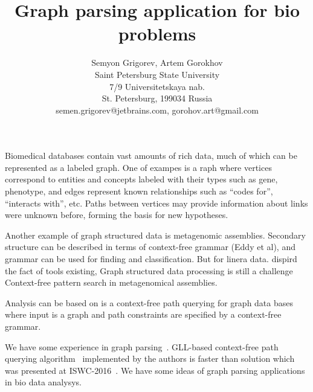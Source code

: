 \documentclass[12pt]{article}  %
\title{Graph parsing application for bio problems}
\author{Semyon Grigorev, Artem Gorokhov
\\
       {Saint Petersburg State University}\\
       {7/9 Universitetskaya nab.}\\
       {St. Petersburg, 199034 Russia}\\
       semen.grigorev@jetbrains.com, gorohov.art@gmail.com
       }
\date{}
\theoremstyle{definition}
\theoremstyle{remark}
\begin{document}
\maketitle

Biomedical databases contain vast amounts of rich data, much of which can be represented as a labeled graph.
One of exampes is a raph where vertices correspond to entities and concepts labeled with their types such as gene, phenotype, and edges represent known relationships such as ``codes for'', ``interacts with'', etc.
Paths between vertices may provide information about links were unknown before, forming the basis for new hypotheses.

Another example of graph structured data is metagenomic assemblies.
Secondary structure can be described in terms of context-free grammar (Eddy et al), and grammar can be used for finding and classification.
But for linera data. 
dispird the fact of tools existing, Graph structured data processing is still a challenge
Context-free pattern search in metagenomical assemblies. 

Analysis can be based on is a context-free path querying for graph data bases where input is a graph and path constraints are specified by a context-free grammar.


We have some experience in graph parsing~\cite{GraphGLL, RelaxedRNGLR}.
GLL-based context-free path querying algorithm~\cite{GraphGLL} implemented by the authors is faster than solution which was presented at ISWC-2016~\cite{CFRDFParsing}. 
We have some ideas of graph parsing applications in bio data analysys.
 
\end{document}
